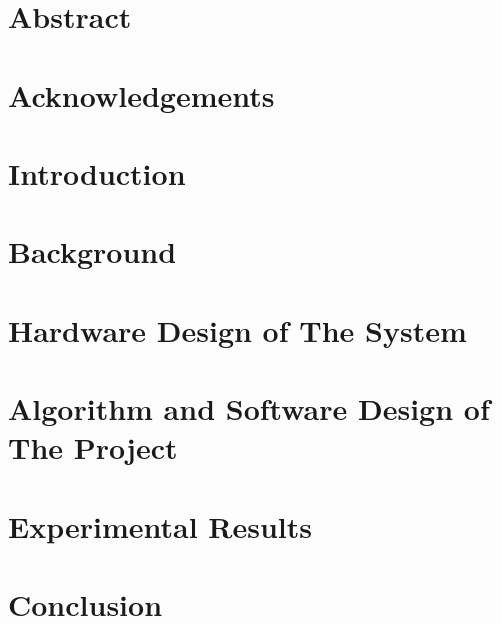 \documentclass[12pt]{report}
\begin{document}
\chapter*{\centering Abstract}


\chapter*{\centering Acknowledgements}


\tableofcontents
{%
\let\oldnumberline\numberline%
\renewcommand{\numberline}{\figurename~\oldnumberline}%
\listoffigures%
}
\listoftables
\printglossary[title={Acronym and Abbreviation}]
\newpage
\setcounter{page}{1}
\chapter{Introduction}

 
\chapter{Background}

% 
 
\chapter{Hardware Design of The System}

 
\chapter{Algorithm and Software Design of The Project}

 
\chapter{Experimental Results}\label{result}


\chapter{Conclusion}


\nocite{*} %


\end{document}
